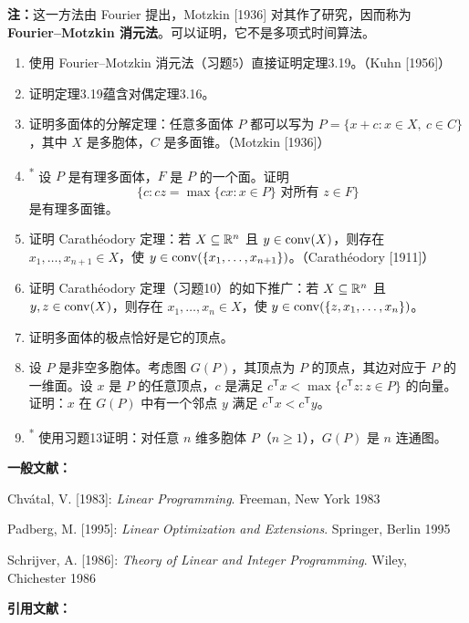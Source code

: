 \textbf{注：}这一方法由 Fourier 提出，Motzkin [1936] 对其作了研究，因而称为 \textbf{Fourier--Motzkin 消元法}。可以证明，它不是多项式时间算法。

\begin{enumerate}[label=\arabic*.,start=6]
\item 使用 Fourier--Motzkin 消元法（习题5）直接证明定理3.19。（Kuhn [1956]）
\item 证明定理3.19蕴含对偶定理3.16。
\item 证明多面体的分解定理：任意多面体 $P$ 都可以写为 $P=\{x+c:x\in X,\ c\in C\}$，其中 $X$ 是多胞体，$C$ 是多面锥。（Motzkin [1936]）
\item\textsuperscript{*} 设 $P$ 是有理多面体，$F$ 是 $P$ 的一个面。证明
\[
\{c:cz=\max\{cx:x\in P\}\text{ 对所有 }z\in F\}
\]
是有理多面锥。
\item 证明 Carathéodory 定理：若 $X\subseteq\mathbb R^n$ 且 $y\in\operatorname{conv}(X)$，则存在 $x_1,\ldots,x_{n+1}\in X$，使 $y\in\operatorname{conv}(\{x_1,\ldots,x_{n+1}\})$。（Carathéodory [1911]）
\item 证明 Carathéodory 定理（习题10）的如下推广：若 $X\subseteq\mathbb R^n$ 且 $y,z\in\operatorname{conv}(X)$，则存在 $x_1,\ldots,x_n\in X$，使 $y\in\operatorname{conv}(\{z,x_1,\ldots,x_n\})$。
\item 证明多面体的极点恰好是它的顶点。
\item 设 $P$ 是非空多胞体。考虑图 $G(P)$，其顶点为 $P$ 的顶点，其边对应于 $P$ 的一维面。设 $x$ 是 $P$ 的任意顶点，$c$ 是满足 $c^{\mathsf T}x<\max\{c^{\mathsf T}z:z\in P\}$ 的向量。证明：$x$ 在 $G(P)$ 中有一个邻点 $y$ 满足 $c^{\mathsf T}x<c^{\mathsf T}y$。
\item\textsuperscript{*} 使用习题13证明：对任意 $n$ 维多胞体 $P$（$n\ge1$），$G(P)$ 是 $n$ 连通图。
\end{enumerate}

\noindent\textbf{一般文献：}
\begin{description}[font=\normalfont,leftmargin=1em]
\item Chvátal, V. [1983]: \textit{Linear Programming}. Freeman, New York 1983
\item Padberg, M. [1995]: \textit{Linear Optimization and Extensions}. Springer, Berlin 1995
\item Schrijver, A. [1986]: \textit{Theory of Linear and Integer Programming}. Wiley, Chichester 1986
\end{description}

\noindent\textbf{引用文献：}

